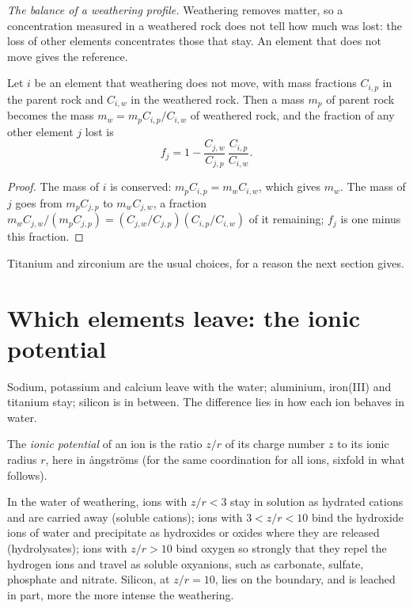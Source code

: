 \emph{The balance of a weathering profile.} Weathering removes matter, so a
concentration measured in a weathered rock does not tell how much was lost:
the loss of other elements concentrates those that stay. An element that does
not move gives the reference.

\begin{proposition}\label{prop:b1:weathering-clays:immobile}
Let $i$ be an element that weathering does not move, with mass fractions
$C_{i,p}$ in the parent rock and $C_{i,w}$ in the weathered rock. Then a mass
$m_p$ of parent rock becomes the mass $m_w = m_p C_{i,p}/C_{i,w}$ of weathered
rock, and the fraction of any other element $j$ lost is
\[
  f_j = 1 - \frac{C_{j,w}}{C_{j,p}}\,\frac{C_{i,p}}{C_{i,w}} .
\]
\end{proposition}

\begin{proof}
The mass of $i$ is conserved: $m_p C_{i,p} = m_w C_{i,w}$, which gives $m_w$.
The mass of $j$ goes from $m_p C_{j,p}$ to $m_w C_{j,w}$, a fraction
$m_w C_{j,w}/(m_p C_{j,p}) = (C_{j,w}/C_{j,p})(C_{i,p}/C_{i,w})$ of it
remaining; $f_j$ is one minus this fraction.
\end{proof}

Titanium and zirconium are the usual choices, for a reason the next section
gives.

\section{Which elements leave: the ionic potential}\label{sec:b1:weathering-clays:ionic}

Sodium, potassium and calcium leave with the water; aluminium, iron(III) and
titanium stay; silicon is in between. The difference lies in how each ion
behaves in water.

\begin{definition}\label{def:b1:weathering-clays:ionic-potential}
The \emph{ionic potential} of an ion is the ratio $z/r$
of its charge number $z$ to its ionic radius $r$, here in ångströms (for the
same coordination for all ions, sixfold in what follows).
\end{definition}

\begin{proposition}\label{prop:b1:weathering-clays:fields}
In the water of weathering, ions with $z/r < 3$ stay in solution as hydrated
cations and are carried away (soluble cations); ions with $3 < z/r < 10$ bind
the hydroxide ions of water and precipitate as hydroxides or oxides where they
are released (hydrolysates); ions with $z/r > 10$ bind oxygen so strongly that
they repel the hydrogen ions and travel as soluble oxyanions, such as
carbonate, sulfate, phosphate and nitrate. Silicon, at $z/r = 10$, lies on the
boundary, and is leached in part, more the more intense the weathering.
\end{proposition}
\admitted

